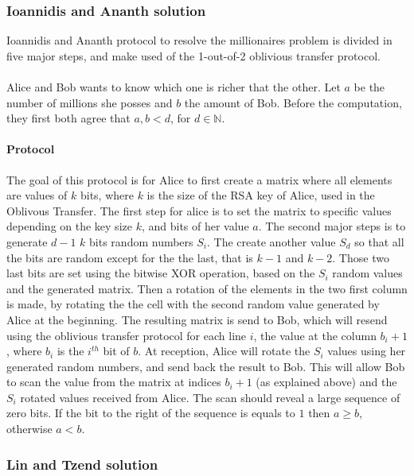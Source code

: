 \documentclass[11pt,a4paper]{article}
\begin{document}
\subsubsection{Ioannidis and Ananth solution}

Ioannidis and Ananth protocol to
resolve
the millionaires problem \cite{ioannidis_efficient_2003}
is divided in five major steps, and make
used of the 1-out-of-2 oblivious transfer protocol.

\paragraph{}

Alice and Bob wants to know which one is richer that the other.
Let $a$ be the number of millions she posses and $b$ the amount
of Bob. Before the computation, they first both agree
that $a, b < d$, for $d \in \mathbb{N}$.

\paragraph{Protocol}

The goal of this protocol is for Alice to first create
a matrix where all elements are values of $k$ bits, where
$k$ is the size of the RSA key of Alice, used in the Oblivous Transfer.
The first step for alice is to set the matrix to specific values
depending on the key size $k$, and bits of her value $a$.
The second major steps is to generate $d - 1$ $k$ bits random
numbers $S_i$. The create another value $S_d$ so that all the
bits are random except for the the last, that is $k-1$ and $k-2$.
Those two last bits are set using the bitwise XOR operation,
based on the $S_i$ random values and the generated matrix.
Then a rotation of the elements in the two first column
is made, by rotating the the cell with the second random
value generated by Alice at the beginning. The resulting
matrix is send to Bob, which will resend using
the oblivious transfer protocol for each line $i$, the value
at the column $b_i + 1$, where $b_i$ is the $i^{th}$ bit of $b$.
At reception, Alice will rotate the $S_i$ values using
her generated random numbers, and send back the result to Bob.
This will allow Bob to scan the value from the matrix at indices $b_i + 1$
(as explained above) and the $S_i$ rotated values received from Alice.
The scan should reveal a large sequence of zero bits. If
the bit to the right of the sequence is equals to $1$ then
$a \ge b$, otherwise $a < b$.


\subsubsection{Lin and Tzend solution}
\end{document}

